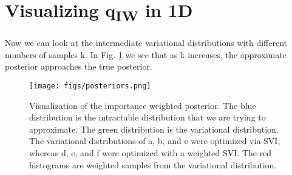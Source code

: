 \documentclass{article} %
\begin{document}
\section{Visualizing q\textsubscript{IW} in 1D}

Now we can look at the intermediate variational distributions with different numbers of samples k. In Fig. \ref{viz} we see that as k increases, the approximate posterior approaches the true posterior. 

\begin{figure}[H]
  \centering
      \texttt{[image: figs/posteriors.png]}
  \caption{Visualization of the importance weighted posterior. The blue distribution is the intractable distribution that we are trying to approximate. The green distribution is the variational distribution. The variational distributions of a, b, and c were optimized via SVI, whereas d, e, and f were optimized with a weighted SVI. The red histograms are weighted samples from the variational distribution.}
  \label{viz}
\end{figure}




        
        
        

\end{document}
